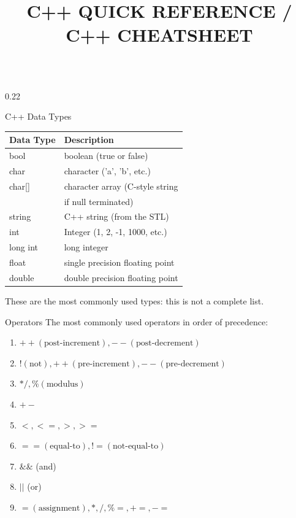 \documentclass[final]{beamer}
\title{C++ QUICK REFERENCE / C++ CHEATSHEET}
\renewcommand{\section}[1]{%
  \par\vspace{1em}%
  {\noindent\usebeamerfont{section title}\Large\bfseries #1\par}%
  \vspace{0.5em}\hrule\vspace{1em}%
}
\begin{document}


\begin{frame}[t,fragile]

\begin{columns}[t,totalwidth=0.95\paperwidth, colsep=0.05\paperwidth]

\begin{column}{0.22\paperwidth}

\begin{block}{C++ Data Types}
\begin{tabular}{|l|l|}
\hline
\textbf{Data Type} & \textbf{Description} \\
\hline
bool & boolean (true or false) \\
\hline
char & character ('a', 'b', etc.) \\
\hline
char[] & character array (C-style string  \\
 & if null terminated) \\
\hline
string & C++ string (from the STL) \\
\hline
int & Integer (1, 2, -1, 1000, etc.) \\
\hline
long int & long integer \\
\hline
float & single precision floating point \\
\hline
double & double precision floating point \\
\hline
\end{tabular}

These are the most commonly used types: this is not a complete list.
\end{block}

\begin{block}{Operators}
The most commonly used operators in order of precedence:
\begin{enumerate}
    \item $++(\text{post-increment}), --(\text{post-decrement})$
    \item $!(\text{not}), ++ (\text{pre-increment}), -- (\text{pre-decrement})$
    \item $* / , \% (\text{modulus})$
    \item $+-$
    \item $<, <=, >, >=\text{}$
    \item $==(\text{equal-to}), != (\text{not-equal-to})$
    \item $\&\&$ (and)
    \item $||$ (or)
    \item $= (\text{assignment}), * , / , \%= , +=, -= $
\end{enumerate}
\end{block}



\end{column}
\end{columns}
\end{frame}
\end{document}
